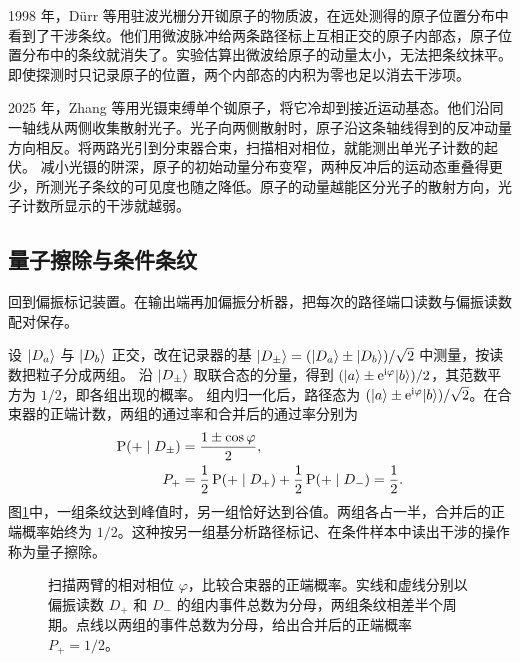 \label{exp:qm-path-1998}1998 年，Dürr 等用驻波光栅分开铷原子的物质波，在远处测得的原子位置分布中看到了干涉条纹。他们用微波脉冲给两条路径标上互相正交的原子内部态，原子位置分布中的条纹就消失了。实验估算出微波给原子的动量太小，无法把条纹抹平。即使探测时只记录原子的位置，两个内部态的内积为零也足以消去干涉项\cite{durr-whichway}。

\label{exp:qm-recoil-2025}2025 年，Zhang 等用光镊束缚单个铷原子，将它冷却到接近运动基态。他们沿同一轴线从两侧收集散射光子。光子向两侧散射时，原子沿这条轴线得到的反冲动量方向相反。将两路光引到分束器合束，扫描相对相位，就能测出单光子计数的起伏。
减小光镊的阱深，原子的初始动量分布变窄，两种反冲后的运动态重叠得更少，所测光子条纹的可见度也随之降低。原子的动量越能区分光子的散射方向，光子计数所显示的干涉就越弱\cite{recoiling-atom}。

\subsection{量子擦除与条件条纹}
\label{ss:qm-quantum-eraser}
回到偏振标记装置。在输出端再加偏振分析器，把每次的路径端口读数与偏振读数配对保存。

设 $\ket{D_a}$ 与 $\ket{D_b}$ 正交，改在记录器的基 $\ket{D_\pm} = (\ket{D_a} \pm \ket{D_b})/\sqrt2$ 中测量，按读数把粒子分成两组。
沿 $\ket{D_\pm}$ 取联合态的分量，得到 $(\ket a \pm \e^{\i\varphi}\ket b)/2$，其范数平方为 $1/2$，即各组出现的概率。
组内归一化后，路径态为 $(\ket a \pm \e^{\i\varphi}\ket b)/\sqrt2$。在合束器的正端计数，两组的通过率和合并后的通过率分别为
\begin{subequations}\label{eq:qm-conditional-interference}
    \begin{align}
        \P(+ \mid D_\pm) &= \frac{1 \pm \cos\varphi}{2},\\
        P_+ &= \frac12\P(+ \mid D_+) + \frac12\P(+ \mid D_-) = \frac12 .
    \end{align}
\end{subequations}
图\ref{fig:qm-quantum-eraser-fringes}中，一组条纹达到峰值时，另一组恰好达到谷值。两组各占一半，合并后的正端概率始终为 $1/2$。这种按另一组基分析路径标记、在条件样本中读出干涉的操作称为量子擦除。

\begin{figure}[htbp]
    \centering
    \caption{扫描两臂的相对相位 $\varphi$，比较合束器的正端概率。实线和虚线分别以偏振读数 $D_+$ 和 $D_-$ 的组内事件总数为分母，两组条纹相差半个周期。点线以两组的事件总数为分母，给出合并后的正端概率 $P_+ = 1/2$。}
    \label{fig:qm-quantum-eraser-fringes}
\end{figure}

